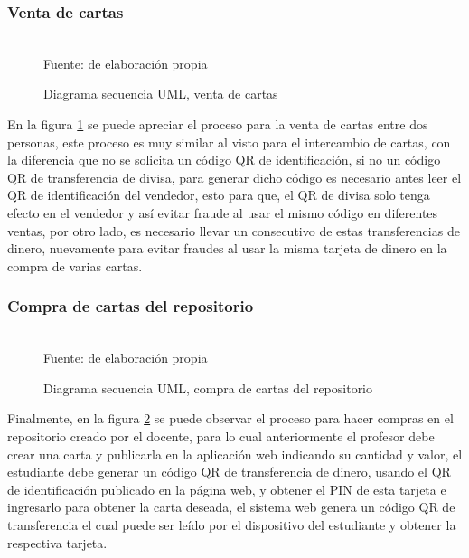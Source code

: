 \subsubsection{Venta de cartas}

\begin{figure}[!htb]
\caption{Diagrama secuencia UML, venta de cartas}
\label{img:UMLventa}
\centering
\begin{adjustbox}{width=12cm}
	
\end{adjustbox}
\\
{\footnotesize Fuente: de elaboración propia}
\end{figure}

En la figura \ref{img:UMLventa} se puede apreciar el proceso para la venta de cartas entre dos personas, este 
proceso es muy similar al visto para el intercambio de cartas, con la diferencia que no se solicita un código 
QR de identificación, si no un código QR de transferencia de divisa, para generar dicho código es necesario 
antes leer el QR de identificación del vendedor, esto para que, el QR de divisa solo tenga efecto en el 
vendedor y así evitar fraude al usar el mismo código en diferentes ventas, por otro lado, es necesario llevar 
un consecutivo de estas transferencias de dinero, nuevamente para evitar fraudes al usar la misma tarjeta de 
dinero en la compra de varias cartas.

\subsubsection{Compra de cartas del repositorio}

\begin{figure}[!htb]
\caption{Diagrama secuencia UML, compra de cartas del repositorio}
\label{img:UMLcompra}
\centering
\begin{adjustbox}{width=8cm}
	
\end{adjustbox}
\\
{\footnotesize Fuente: de elaboración propia}
\end{figure}

Finalmente, en la figura \ref{img:UMLcompra} se puede observar el proceso para hacer compras en el repositorio 
creado por el docente, para lo cual anteriormente el profesor debe crear una carta y publicarla en la 
aplicación web indicando su cantidad y valor, el estudiante debe generar un código QR de transferencia de 
dinero, usando el QR de identificación publicado en la página web, y obtener el PIN de esta tarjeta e 
ingresarlo para obtener la carta deseada, el sistema web genera un código QR de transferencia el cual puede 
ser leído por el dispositivo del estudiante y obtener la respectiva tarjeta.

